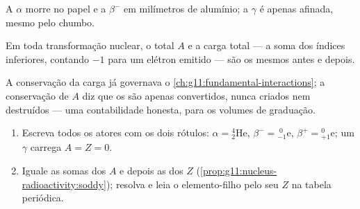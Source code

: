 \begin{omfigure}

{\small A $\alpha$ morre no papel e a $\beta^-$ em milímetros de
alumínio; a $\gamma$ é apenas afinada, mesmo pelo chumbo.}
\end{omfigure}

\begin{proposition}\label{prop:g11:nucleus-radioactivity:soddy}
Em toda transformação nuclear, o  total $A$ e a carga
total --- a soma dos índices inferiores, contando $-1$ para um elétron
emitido --- são os mesmos antes e depois.
\end{proposition}
\admitted

\begin{remark}
A conservação da carga já governava o
\cref{ch:g11:fundamental-interactions}; a conservação de $A$ diz que os
 são apenas convertidos, nunca criados nem destruídos --- uma
contabilidade honesta, para os volumes de graduação.
\end{remark}

\begin{method}\label{met:g11:nucleus-radioactivity:balance}
\begin{enumerate}
  \item Escreva todos os atores com os dois rótulos:
        $\alpha = {}^{4}_{2}\mathrm{He}$,
        $\beta^- = {}^{\;0}_{-1}\mathrm{e}$,
        $\beta^+ = {}^{0}_{+1}\mathrm{e}$; um $\gamma$ carrega
        $A = Z = 0$.
  \item Iguale as somas dos $A$ e depois as dos $Z$
        (\cref{prop:g11:nucleus-radioactivity:soddy}); resolva e leia o
        elemento-filho pelo seu $Z$ na tabela periódica.
\end{enumerate}
\end{method}

